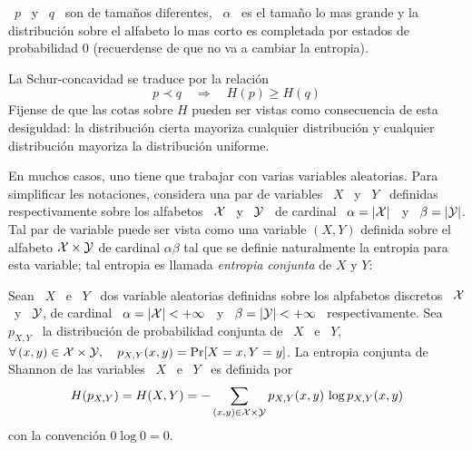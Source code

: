 \begin{propiedades}
\begin{definicion}[Mayorizaci\'on]
    \ $p$ \ y  \ $q$ \ son de tama\~nos diferentes, \  $\alpha$ \ es el tama\~no
    lo  mas  grande y  la  distribuci\'on  sobre el  alfabeto  lo  mas corto  es
    completada por estados de probabilidad 0 (recuerdense de que no va a cambiar
    la entropia).
  \end{definicion}
  La  Schur-concavidad  se  traduce  por  la  relaci\'on
  \[
  p \prec  q \quad \Rightarrow  \quad H(p) \ge  H(q)
  \]
  Fijense de que las cotas sobre $H$ pueden ser vistas como consecuencia de esta
  desiguldad:  la  distribuci\'on  cierta  mayoriza cualquier  distribuci\'on  y
  cualquier  distribuci\'on mayoriza  la distribuci\'on  uniforme.  
\end{propiedades}

En muchos  casos, uno tiene que  trabajar con varias  variables aleatorias. Para
simplificar les  notaciones, considera una par  de variables \  $X$ \ y \  $Y$ \
definidas respectivamente sobre los alfabetos \ $\mathcal{X}$  \ y \ $\mathcal{Y}$ \ de cardinal \
$\alpha = |\mathcal{X}|$ \ y \ $\beta =  |\mathcal{Y}|$.  Tal par de variable puede ser vista como
una  variable $(X,Y)$  definida sobre  el alfabeto  $\mathcal{X} \times  \mathcal{Y}$  de cardinal
$\alpha \beta$ tal  que se definie naturalmente la  entropia para esta variable;
tal entropia es llamada {\it entropia conjunta} de $X$ y $Y$:
%
\begin{definicion}\label{def:SZ:EntropiaConjunta}
  Sean \ $X$ \ e \ $Y$  \ dos variable aleatorias definidas sobre los alpfabetos
  discretos \  $\mathcal{X}$ \ y \ $\mathcal{Y}$,  de cardinal \ $\alpha  = |\mathcal{X}| < +\infty$  \ y \
  $\beta  =   |\mathcal{Y}|  <  +\infty$  \   respectivamente.  Sea  \   $p_{X,Y}$  \  la
  distribuci\'on de probabilidad conjunta de \ $X$ \ e \ $Y$, \ \ie $ \forall \,
  (x,y) \in \mathcal{X} \times \mathcal{Y}, \quad p_{X,Y}(x,y) =  \Pr[X = x , Y = y]$. La entropia
  conjunta de Shannon de las variables \ $X$ \ e \ $Y$ \ es definida por
  \[
  H(p_{X,Y}) =  H(X,Y) = -  \sum_{(x,y) \in \mathcal{X}  \times \mathcal{Y}} p_{X,Y}(x,y)  \, \log
  p_{X,Y}(x,y)
  \]
  con la convenci\'on $0 \log 0 = 0$.
\end{definicion}


